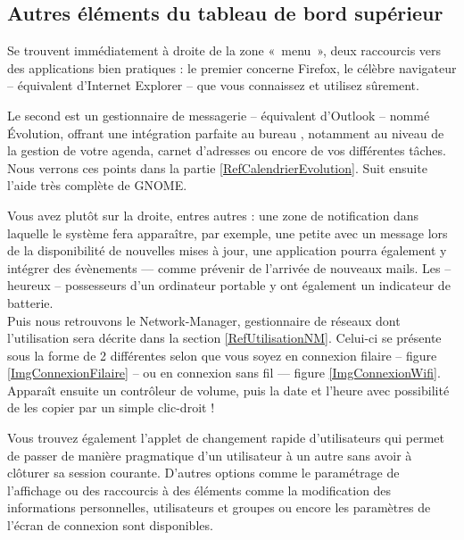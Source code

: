 \subsection{Autres éléments du tableau de bord supérieur}
\label{RefSwitchUser}
Se trouvent immédiatement à droite de la zone «~menu~», deux raccourcis vers des applications bien pratiques : le premier concerne Firefox, le célèbre navigateur  -- équivalent d'Internet Explorer -- que vous connaissez et utilisez sûrement.\par
Le second est un gestionnaire de messagerie -- équivalent d'Outlook -- nommé Évolution, offrant une intégration parfaite au bureau , notamment au niveau de la gestion de votre agenda, carnet d'adresses ou encore de vos différentes tâches. Nous verrons ces points dans la partie \ref{RefCalendrierEvolution}. Suit ensuite l'aide très complète de GNOME.\par
Vous avez plutôt sur la droite, entres autres : une zone de notification dans laquelle le système fera apparaître, par exemple, une petite  avec un message lors de la disponibilité de nouvelles mises à jour, une application pourra également y intégrer des évènements --- comme prévenir de l'arrivée de nouveaux mails. Les -- heureux -- possesseurs d'un ordinateur portable y ont également un indicateur de batterie.\\
Puis nous retrouvons le Network-Manager, gestionnaire de réseaux dont l'utilisation sera décrite dans la section \ref{RefUtilisationNM}. Celui-ci se présente sous la forme de 2  différentes selon que vous soyez en connexion filaire -- figure \ref{ImgConnexionFilaire} -- ou en connexion sans fil --- figure \ref{ImgConnexionWifi}.\\
Apparaît ensuite un contrôleur de volume, puis la date et l'heure avec possibilité de les copier par un simple clic-droit !\par
Vous trouvez également l'applet de changement rapide d'utilisateurs qui permet de passer de manière pragmatique d'un utilisateur à un autre sans avoir à clôturer sa session courante. D'autres options comme le paramétrage de l'affichage ou des raccourcis à des éléments comme la modification des informations personnelles, utilisateurs et groupes ou encore les paramètres de l'écran de connexion sont disponibles.\\
